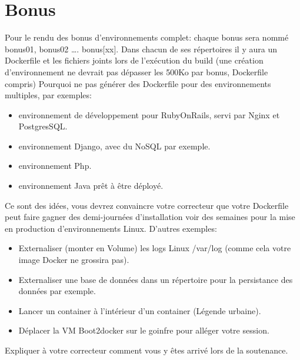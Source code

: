 \documentclass{42}
\begin{document}
\newpage

\chapter{Bonus}

Pour le rendu des bonus d'environnements complet:
\newline
chaque bonus sera nommé bonus01, bonus02 …. bonus[xx].
\newline
\newline
Dans chacun de ses répertoires il y aura un Dockerfile et les fichiers joints lors de l’exécution du build (une création d'environnement ne devrait pas dépasser les 500Ko par bonus, Dockerfile compris)
\newline
\newline
Pourquoi ne pas générer des Dockerfile pour des environnements multiples, par exemples:
\newline
\begin{itemize}
	\item environnement de développement pour RubyOnRails, servi par Nginx et PostgresSQL.
	\item environnement Django, avec du NoSQL par exemple.
	\item environnement Php.
	\item environnement Java prêt à être déployé.
\end{itemize}
Ce sont des idées, vous devrez convaincre votre correcteur que votre Dockerfile peut faire gagner des demi-journées d’installation voir des semaines pour la mise en production d'environnements Linux.
\newline
\newline
D’autres exemples:
\newline
\begin{itemize}
	\item Externaliser (monter en Volume) les logs Linux /var/log (comme cela votre image Docker ne grossira pas).
	\item Externaliser une base de données dans un répertoire pour la persistance des données par exemple.
	\item Lancer un container à l'intérieur d’un container (Légende urbaine).
	\item Déplacer la VM Boot2docker sur le goinfre pour alléger votre session.
\end{itemize}

Expliquer à votre correcteur comment vous y êtes arrivé lors de la soutenance.
\end{document}
